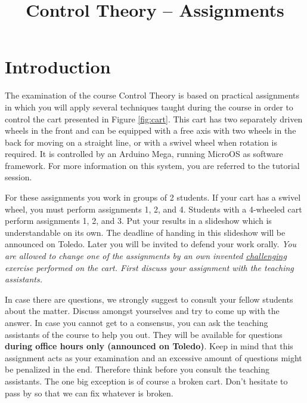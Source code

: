 \documentclass[10pt,a4paper]{article}
\title{\textbf{Control Theory -- Assignments}}
\date{\vspace{-5ex}}
\begin{document}
\maketitle

\section{Introduction}
The examination of the course Control Theory is based on practical assignments in which you will apply several techniques taught during the course in order to control the cart presented in Figure \ref{fig:cart}. This cart has two separately driven wheels in the front and can be equipped with a free axis with two wheels in the back for moving on a straight line, or with a swivel wheel when rotation is required. It is controlled by an Arduino Mega, running MicroOS as software framework. For more information on this system, you are referred to the tutorial session.

For these assignments you work in groups of 2 students. If your cart has a swivel wheel, you must perform assignments 1, 2, and 4. Students with a 4-wheeled cart perform assignments 1, 2, and 3. Put your results in a slideshow which is understandable on its own. The deadline of handing in this slideshow will be announced on Toledo. Later you will be invited to defend your work orally. \textit{You are allowed to change one of the assignments by an own invented \underline{challenging} exercise performed on the cart. First discuss your assignment with the teaching assistants.}

In case there are questions, we strongly suggest to consult your fellow students about the matter. Discuss amongst yourselves and try to come up with the answer. In case you cannot get to a consensus, you can ask the teaching assistants of the course to help you out. They will be available for questions \textbf{during office hours only (announced on Toledo)}. Keep in mind that this assignment acts as your examination and an excessive amount of questions might be penalized in the end. Therefore think before you consult the teaching assistants. The one big exception is of course a broken cart. Don't hesitate to pass by so that we can fix whatever is broken.
\end{document}
